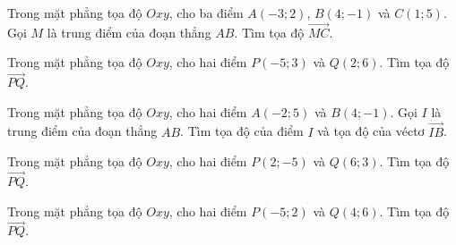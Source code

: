 \begin{bt}%
	Trong mặt phẳng tọa độ $Oxy$, cho ba điểm $A(-3; 2)$, $B(4; -1)$ và $C(1; 5)$. Gọi $M$ là trung điểm của đoạn thẳng $AB$. Tìm tọa độ $\overrightarrow{MC}$.
\end{bt}

\begin{bt}%
	Trong mặt phẳng tọa độ $Oxy$, cho hai điểm $P(-5; 3)$ và $Q(2; 6)$. Tìm tọa độ $\overrightarrow{PQ}$.
\end{bt}

\begin{bt}%
	Trong mặt phẳng tọa độ $Oxy$, cho hai điểm $A(-2; 5)$ và $B(4; -1)$. Gọi $I$ là trung điểm của đoạn thẳng $AB$. Tìm tọa độ của điểm $I$ và tọa độ của véctơ $\overrightarrow{IB}$.
\end{bt}

\begin{bt}%
	Trong mặt phẳng tọa độ $Oxy$, cho hai điểm $P(2; -5)$ và $Q(6; 3)$. Tìm tọa độ $\overrightarrow{PQ}$.
\end{bt}

\begin{bt}%
Trong mặt phẳng tọa độ $Oxy$, cho hai điểm $P(-5; 2)$ và $Q(4; 6)$. Tìm tọa độ $\overrightarrow{PQ}$.
\end{bt}


